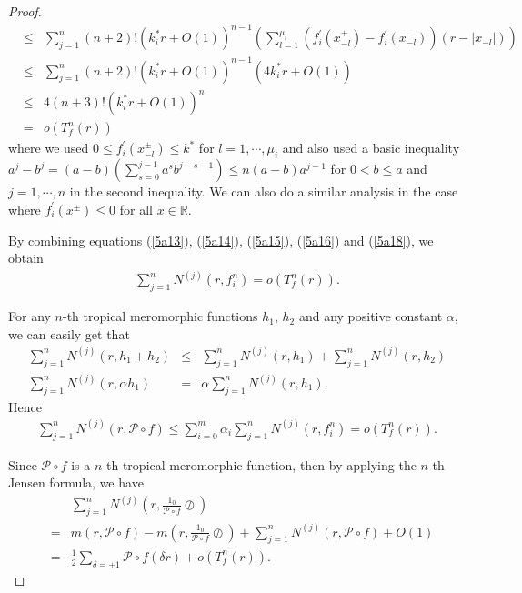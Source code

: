 \documentclass{article}
\begin{document}
\begin{proof}
\begin{eqnarray}
        &\leq&\sum_{j=1}^{n}(n+2)!\left(k_{i}^{*}r+O(1)\right)^{n-1}\left(\sum_{l=1}^{\mu_{i}}(f_{i}^{'}(x_{-l}^{+})-f_{i}^{'}(x_{-l}^{-}))(r-|x_{-l}|)\right)\nonumber\\
        &\leq&\sum_{j=1}^{n}(n+2)!\left(k_{i}^{*}r+O(1)\right)^{n-1}\left(4k_{i}^{*}r+O(1)\right)\nonumber\\
        &\leq&4(n+3)!\left(k_{i}^{*}r+O(1)\right)^{n}\nonumber\\
        &=&o(T_{f}^{n}(r))
    \end{eqnarray}
    where we used $0\leq f_{i}^{'}(x_{-l}^{\pm})\leq k^{*}$ for $l=1, \cdots, \mu_{i}$ and also used a basic inequality $a^{j}-b^{j}=(a-b)(\sum_{s=0}^{j-1}a^{s}b^{j-s-1})\leq n(a-b)a^{j-1}$ for $0<b\leq a$ and $j=1, \cdots, n$ in the second inequality. We can also do a similar analysis in the case where $f_{i}^{'}(x^{\pm})\leq 0$ for all $x\in\mathbb{R}$.

    By combining equations (\ref{5a13}), (\ref{5a14}), (\ref{5a15}), (\ref{5a16}) and (\ref{5a18}), we obtain
    \begin{eqnarray}\label{5a19}
        \sum_{j=1}^{n}N^{(j)}(r, f_{i}^{n})=o(T_{f}^{n}(r)).
    \end{eqnarray}
    
    For any $n$-th tropical meromorphic functions $h_{1}$, $h_{2}$ and any positive constant $\alpha$, we can easily get that
    \begin{eqnarray*}
        \sum_{j=1}^{n}N^{(j)}(r, h_{1}+h_{2})&\leq& \sum_{j=1}^{n}N^{(j)}(r, h_{1})+\sum_{j=1}^{n}N^{(j)}(r, h_{2})\\
        \sum_{j=1}^{n}N^{(j)}(r, \alpha h_{1})&=&\alpha \sum_{j=1}^{n}N^{(j)}(r, h_{1}).
    \end{eqnarray*}
    Hence
    \begin{eqnarray*}
        \sum_{j=1}^{n}N^{(j)}(r, \mathcal{P}\circ f)\leq \sum_{i=0}^{m}\alpha_{i}\sum_{j=1}^{n}N^{(j)}(r, f_{i}^{n})=o(T_{f}^{n}(r)).
    \end{eqnarray*}

    Since $\mathcal{P}\circ f$ is a $n$-th tropical meromorphic function, then by applying the $n$-th Jensen formula, we have
    \begin{eqnarray}\label{Pn}
        &&\sum_{j=1}^{n}N^{(j)}\left(r, \frac{1_{0}}{\mathcal{P}\circ f}\oslash\right)\nonumber\\
        &=&m(r, \mathcal{P}\circ f)-m\left(r, \frac{1_{0}}{\mathcal{P}\circ f}\oslash\right)+\sum_{j=1}^{n}N^{(j)}\left(r, \mathcal{P}\circ f\right)+O(1)\nonumber\\
        &=&\frac{1}{2}\sum_{\delta=\pm 1}\mathcal{P}\circ f(\delta r)+o(T_{f}^{n}(r)).
    \end{eqnarray}


\end{proof}
\end{document}
